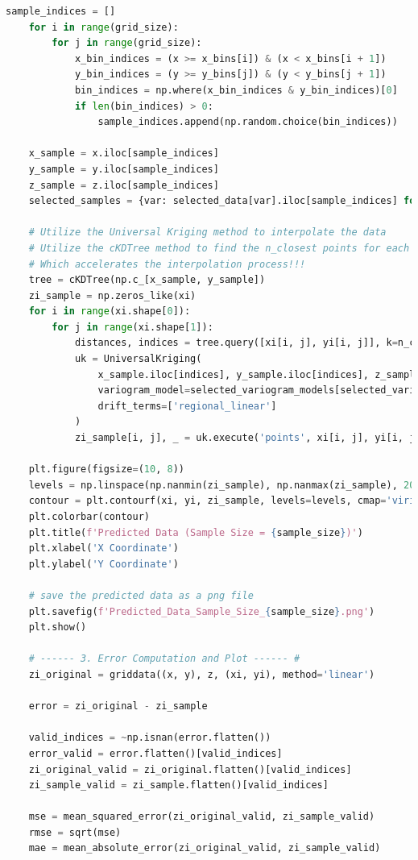 \documentclass{swmcmthesis}
\begin{document}
\begin{lstlisting}[language=python,caption={The python programme for Problem 3 - Co-Kriging}]
    sample_indices = []
    for i in range(grid_size):
        for j in range(grid_size):
            x_bin_indices = (x >= x_bins[i]) & (x < x_bins[i + 1])
            y_bin_indices = (y >= y_bins[j]) & (y < y_bins[j + 1])
            bin_indices = np.where(x_bin_indices & y_bin_indices)[0]
            if len(bin_indices) > 0:
                sample_indices.append(np.random.choice(bin_indices))

    x_sample = x.iloc[sample_indices]
    y_sample = y.iloc[sample_indices]
    z_sample = z.iloc[sample_indices]
    selected_samples = {var: selected_data[var].iloc[sample_indices] for var in selected_variables}

    # Utilize the Universal Kriging method to interpolate the data
    # Utilize the cKDTree method to find the n_closest points for each grid point.
    # Which accelerates the interpolation process!!!
    tree = cKDTree(np.c_[x_sample, y_sample])
    zi_sample = np.zeros_like(xi)
    for i in range(xi.shape[0]):
        for j in range(xi.shape[1]):
            distances, indices = tree.query([xi[i, j], yi[i, j]], k=n_closest)
            uk = UniversalKriging(
                x_sample.iloc[indices], y_sample.iloc[indices], z_sample.iloc[indices],
                variogram_model=selected_variogram_models[selected_variables[0]],  # use the variogram model of the first selected variable
                drift_terms=['regional_linear']
            )
            zi_sample[i, j], _ = uk.execute('points', xi[i, j], yi[i, j])

    plt.figure(figsize=(10, 8))
    levels = np.linspace(np.nanmin(zi_sample), np.nanmax(zi_sample), 20)
    contour = plt.contourf(xi, yi, zi_sample, levels=levels, cmap='viridis') 
    plt.colorbar(contour) 
    plt.title(f'Predicted Data (Sample Size = {sample_size})')
    plt.xlabel('X Coordinate')
    plt.ylabel('Y Coordinate')

    # save the predicted data as a png file
    plt.savefig(f'Predicted_Data_Sample_Size_{sample_size}.png')
    plt.show()

    # ------ 3. Error Computation and Plot ------ #
    zi_original = griddata((x, y), z, (xi, yi), method='linear')

    error = zi_original - zi_sample

    valid_indices = ~np.isnan(error.flatten()) 
    error_valid = error.flatten()[valid_indices]
    zi_original_valid = zi_original.flatten()[valid_indices]
    zi_sample_valid = zi_sample.flatten()[valid_indices]

    mse = mean_squared_error(zi_original_valid, zi_sample_valid)
    rmse = sqrt(mse)
    mae = mean_absolute_error(zi_original_valid, zi_sample_valid)


\end{lstlisting}
\end{document}
